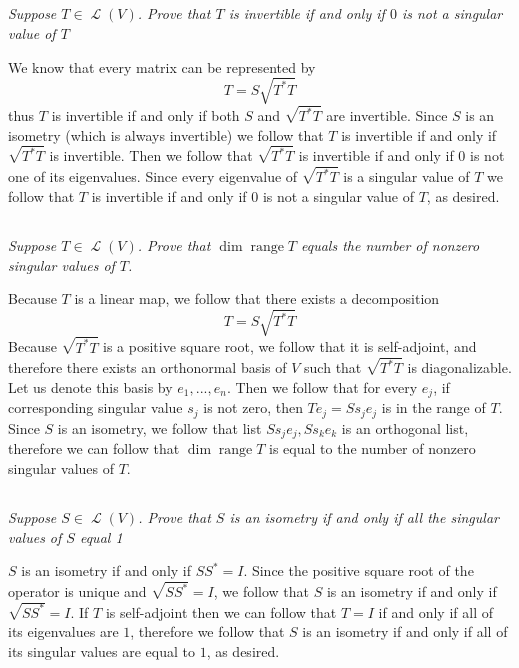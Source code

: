 \documentclass[11pt,oneside,titlepage]{book}
\DeclareMathOperator \map {\mathcal {L}}
\DeclareMathOperator \range {range}
\begin{document}
\subsection{}

\textit{Suppose $T \in \map(V)$. Prove that $T$ is invertible if and only if $0$ is
  not a singular value of $T$}

We know that every matrix can be represented by
$$T = S \sqrt{T^* T}$$
thus $T$ is invertible if and only if both $S$ and $\sqrt{T^* T}$ are invertible. Since
$S$ is an isometry (which is always invertible) we follow that $T$ is invertible if and
only if $\sqrt{T^* T}$ is invertible. Then we follow that $\sqrt{T^* T}$ is invertible
if and only if 0 is not one of its eigenvalues. Since every eigenvalue of $\sqrt{T^* T}$
is a singular value of $T$ we follow that $T$ is invertible if and only if $0$ is
not a singular value of $T$, as desired.

\subsection{}

\textit{Suppose $T \in \map(V)$. Prove that $\dim \range T$ equals the number of nonzero
  singular values of $T$.}

Because $T$ is a linear map, we follow that there exists a decomposition
$$T = S \sqrt{T^* T}$$
Because $\sqrt{T^* T}$ is a positive square root, we follow that it is self-adjoint, and
therefore there exists an orthonormal basis of $V$ such that $\sqrt{T^* T}$ is
diagonalizable. Let us denote this basis by $e_1, ..., e_n$. Then we follow that for every $e_j$,
if corresponding singular value $s_j$ is not zero, then $T e_j = S s_j e_j$ is in
the range of $T$. Since $S$ is an isometry, we follow that list $S s_j e_j, S s_k e_k$  is
an orthogonal list, therefore we can follow that $\dim \range T$ is equal to the number of
nonzero singular values of $T$.

\subsection{}

\textit{Suppose $S \in \map(V)$. Prove that $S$ is an isometry if and only if all the singular
  values of $S$ equal 1}

$S$ is an isometry if and only if $S S^* = I$. Since the positive square root of the
operator is unique and $\sqrt{S S^*} = I$, we follow that $S$ is an isometry if and only if
$\sqrt{S S^*} = I$. If $T$ is self-adjoint then we can follow that $T = I$ if and only if all
of its eigenvalues are $1$, therefore we follow that $S$ is an isometry if and only if
all of its singular values are equal to $1$, as desired.
\end{document}
